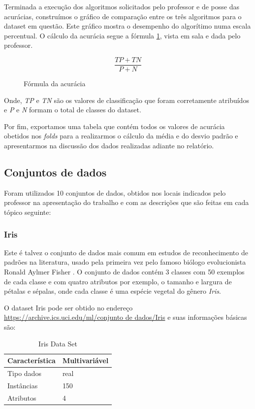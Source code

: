 \documentclass[12pt, a4paper]{article}
\begin{document}
Terminada a execução dos algoritmos solicitados pelo professor e de posse das acurácias, construímos o gráfico de comparação entre os três algoritmos para o dataset em questão. Este gráfico mostra o desempenho do algorítimo numa escala percentual. O cálculo da acurácia segue a fórmula \ref{foracur}, vista em sala e dada pelo professor.

\begin{figure}[!ht]
\centering
	\[\frac{TP+TN}{P+N}\]
    \caption{Fórmula da acurácia}
    \label{foracur}
\end{figure}

Onde, \textit{TP} e \textit{TN} são os valores de classificação que foram corretamente atribuídos e \textit{P} e \textit{N} formam o total de classes do dataset.

Por fim, exportamos uma tabela que contém todos os valores de acurácia obetidos nos \textit{folds} para a realizarmos o cálculo da média e do desvio padrão e apresentarmos na discussão dos dados realizadas adiante no relatório.

\subsection{Conjuntos de dados}

Foram utilizados 10 conjuntos de dados, obtidos nos locais indicados pelo professor na apresentação do trabalho e com as descrições que são feitas em cada tópico seguinte:

\subsubsection{Iris}
Este é talvez o conjunto de dados mais comum em estudos de reconhecimento de padrões na literatura, usado pela primeira vez pelo famoso biólogo evolucionista Ronald Aylmer Fisher \citep{Fisher1936}. O conjunto de dados contém 3 classes com 50 exemplos de cada classe e com quatro atributos por exemplo, o tamanho e largura de pétalas e sépalas, onde cada classe é uma espécie vegetal do gênero \emph{Iris}.

O dataset Iris pode ser obtido no endereço \url{https://archive.ics.uci.edu/ml/conjunto de dados/Iris} e suas informações básicas são:
\begin{table}[!ht]
\centering
\caption{Iris Data Set}
\label{iristable}
\begin{tabular}{|l|l|}
\hline
Característica & Multivariável\\
\hline
Tipo dados & real\\
\hline
Instâncias & 150\\
\hline
Atributos & 4 \\
\hline
\end{tabular}
\end{table}
\end{document}
